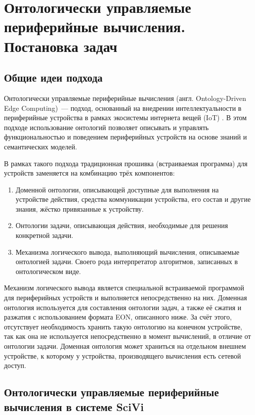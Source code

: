 \chapter{Онтологически управляемые периферийные вычисления. Постановка задач}

\section{Общие идеи подхода}

Онтологически управляемые периферийные вычисления (англ. Ontology-Driven Edge Computing)~--- подход, основанный на внедрении интеллектуальности в периферийные устройства в рамках экосистемы интернета вещей (IoT) \cite{incollection:onto-reasoning-on-mcu}. 
В этом подходе использование онтологий позволяет описывать и управлять функциональностью и поведением периферийных устройств на основе знаний и семантических моделей.

В рамках такого подхода традиционная прошивка (встраиваемая программа) для устройств заменяется на комбинацию трёх компонентов:
\begin{enumerate}
	\item Доменной онтологии, описывающей доступные для выполнения на устройстве действия, средства коммуникации устройства, его состав и другие знания, жёстко привязанные к устройству.
	\item Онтологии задачи, описывающая действия, необходимые для решения конкретной задачи.
	\item Механизма логического вывода, выполняющий вычисления, описываемые онтологией задачи.
	Своего рода интерпретатор алгоритмов, записанных в онтологическом виде.
\end{enumerate}

Механизм логического вывода является специальной встраиваемой программой для периферийных устройств и выполняется непосредственно на них.
Доменная онтология используется для составления онтологии задач, а также её сжатия и разжатия с использованием формата EON, описанного ниже.
За счёт этого, отсутствует необходимость хранить такую онтологию на конечном устройстве, так как она не используется непосредственно в момент вычислений, в отличие от онтологии задачи.
Доменная онтология может храниться на отдельном внешнем устройстве, к которому у устройства, производящего вычисления есть сетевой доступ.

\section{Онтологически управляемые периферийные вычисления в системе SciVi}

